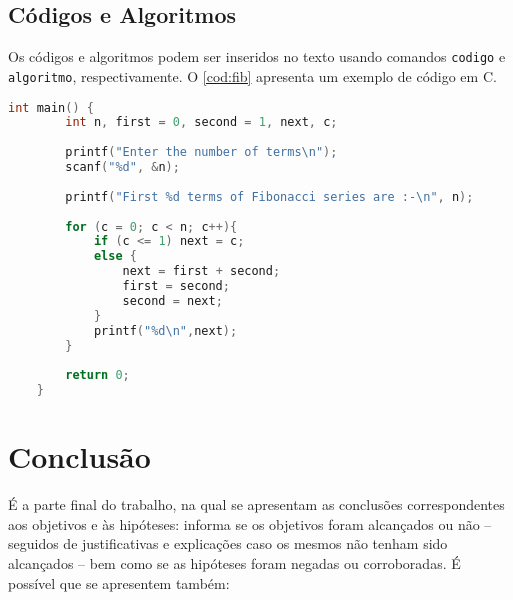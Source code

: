 \documentclass[12pt,oneside,a4paper,chapter=TITLE,section=TITLE,sumario=tradicional]{abntex2}
\begin{document}
\section{Códigos e Algoritmos}
\label{sec:codigos}

Os códigos e algoritmos podem ser inseridos no texto usando comandos 
\texttt{codigo} e \texttt{algoritmo}, respectivamente. O \autoref{cod:fib} 
apresenta um exemplo de código em C.

\begin{codigo}[htb]
    \begin{lstlisting}[language=C]
    int main() {
        int n, first = 0, second = 1, next, c;
        
        printf("Enter the number of terms\n");
        scanf("%d", &n);
        
        printf("First %d terms of Fibonacci series are :-\n", n);
        
        for (c = 0; c < n; c++){
            if (c <= 1) next = c;
            else {
                next = first + second;
                first = second;
                second = next;
            }
            printf("%d\n",next);
        }
        
        return 0;
    }
    \end{lstlisting}
    
    \fonteautor
\end{codigo}


\chapter{Conclusão}

É a parte final do trabalho, na qual se apresentam as conclusões 
correspondentes aos objetivos e às hipóteses: informa se os objetivos foram 
alcançados ou não – seguidos de justificativas e explicações caso os mesmos não 
tenham sido alcançados – bem como se as hipóteses foram negadas ou 
corroboradas. É possível que se apresentem também:
\end{document}

